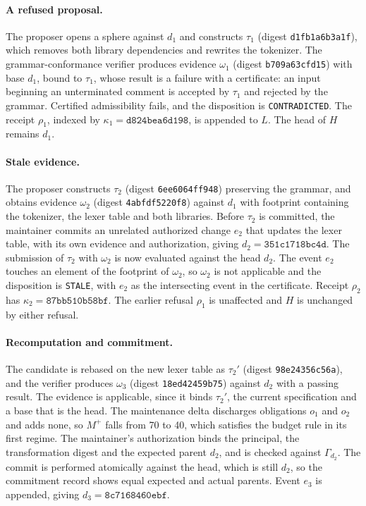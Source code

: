 \documentclass[11pt]{article}
\theoremstyle{remark}
\begin{document}
\paragraph{A refused proposal.} The proposer opens a sphere against $d_1$ and constructs $\tau_1$ (digest \texttt{d1fb1a6b3a1f}), which removes both library dependencies and rewrites the tokenizer. The grammar-conformance verifier produces evidence $\omega_1$ (digest \texttt{b709a63cfd15}) with base $d_1$, bound to $\tau_1$, whose result is a failure with a certificate: an input beginning an unterminated comment is accepted by $\tau_1$ and rejected by the grammar. Certified admissibility fails, and the disposition is \texttt{CONTRADICTED}. The receipt $\rho_1$, indexed by $\kappa_1=\texttt{d824bea6d198}$, is appended to $L$. The head of $H$ remains $d_1$.

\paragraph{Stale evidence.} The proposer constructs $\tau_2$ (digest \texttt{6ee6064ff948}) preserving the grammar, and obtains evidence $\omega_2$ (digest \texttt{4abfdf5220f8}) against $d_1$ with footprint containing the tokenizer, the lexer table and both libraries. Before $\tau_2$ is committed, the maintainer commits an unrelated authorized change $e_2$ that updates the lexer table, with its own evidence and authorization, giving $d_2=\texttt{351c1718bc4d}$. The submission of $\tau_2$ with $\omega_2$ is now evaluated against the head $d_2$. The event $e_2$ touches an element of the footprint of $\omega_2$, so $\omega_2$ is not applicable and the disposition is \texttt{STALE}, with $e_2$ as the intersecting event in the certificate. Receipt $\rho_2$ has $\kappa_2=\texttt{87bb510b58bf}$. The earlier refusal $\rho_1$ is unaffected and $H$ is unchanged by either refusal.

\paragraph{Recomputation and commitment.} The candidate is rebased on the new lexer table as $\tau_2'$ (digest \texttt{98e24356c56a}), and the verifier produces $\omega_3$ (digest \texttt{18ed42459b75}) against $d_2$ with a passing result. The evidence is applicable, since it binds $\tau_2'$, the current specification and a base that is the head. The maintenance delta discharges obligations $o_1$ and $o_2$ and adds none, so $M^{+}$ falls from 70 to 40, which satisfies the budget rule in its first regime. The maintainer's authorization binds the principal, the transformation digest and the expected parent $d_2$, and is checked against $\Gamma_{d_2}$. The commit is performed atomically against the head, which is still $d_2$, so the commitment record shows equal expected and actual parents. Event $e_3$ is appended, giving $d_3=\texttt{8c7168460ebf}$.
\end{document}
